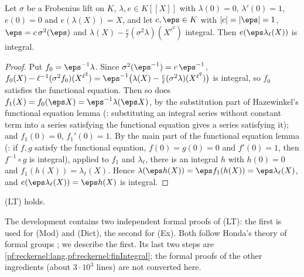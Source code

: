 \begin{lemma}\label{pf:reckernel:finIntegral}
Let $\sigma$ be a Frobenius lift on $K$, $\lambda,e\in K[[X]]$ with $\lambda(0)=0$, $\lambda'(0)=1$, $e(0)=0$ and
$e(\lambda(X))=X$, and let $c,\eps\in K$ with $|c|=|\eps|=1$, $\eps=c\,\sigma^2(\eps)$ and
$\lambda(X)-\frac c\ell(\sigma^2\lambda)(X^{\ell^2})$ integral. Then $e(\eps\lambda_\ell(X))$ is integral.
\end{lemma}

\begin{proof}
Put $f_0=\eps^{-1}\lambda$. Since $\sigma^2(\eps^{-1})=c\,\eps^{-1}$,
$f_0(X)-\ell^{-1}(\sigma^2f_0)(X^{\ell^2})=\eps^{-1}\bigl(\lambda(X)-\frac c\ell(\sigma^2\lambda)(X^{\ell^2})\bigr)$ is
integral, so $f_0$ satisfies the functional equation. Then so does $f_1(X)=f_0(\eps X)=\eps^{-1}\lambda(\eps X)$, by the
substitution part of Hazewinkel's functional equation lemma \cite{Hazewinkel1978}
(: substituting an integral series without constant term into a series satisfying
the functional equation gives a series satisfying it); and $f_1(0)=0$, $f_1'(0)=1$. By the main part of the functional
equation lemma (: if $f,g$ satisfy the functional equation, $f(0)=g(0)=0$ and
$f'(0)=1$, then $f^{-1}\circ g$ is integral), applied to $f_1$ and $\lambda_\ell$, there is an integral $h$ with
$h(0)=0$ and $f_1(h(X))=\lambda_\ell(X)$. Hence $\lambda(\eps h(X))=\eps f_1(h(X))=\eps\lambda_\ell(X)$, and
$e(\eps\lambda_\ell(X))=\eps h(X)$ is integral.
\end{proof}

\begin{theorem}\label{pf:reckernel:cm3}
\textup{(LT)} holds.
\end{theorem}

The development contains two independent formal proofs of (LT): the first is used for (Mod)
and (Dict), the second for (Ex). Both follow Honda's theory of formal groups \cite{Honda1970}; we describe the first.
Its last two steps are \cref{pf:reckernel:lang,pf:reckernel:finIntegral}; the formal proofs of the other ingredients
(about $3\cdot10^3$ lines) are not converted here.

